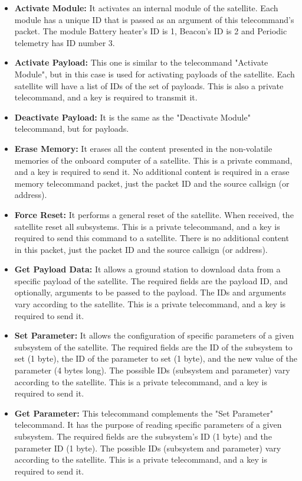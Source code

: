 \begin{itemize}
    \item \textbf{Activate Module: }It activates an internal module of the satellite. Each module has a unique ID that is passed as an argument of this telecommand's packet. The module Battery heater's ID is 1, Beacon's ID is 2 and Periodic telemetry has ID number 3. 
    \item \textbf{Activate Payload:} This one is similar to the telecommand "Activate Module", but in this case is used for activating payloads of the satellite. Each satellite will have a list of IDs of the set of payloads. This is also a private telecommand, and a key is required to transmit it.
    \item \textbf{Deactivate Payload:} It is the same as the "Deactivate Module" telecommand, but for payloads.
    \item \textbf{Erase Memory:} It erases all the content presented in the non-volatile memories of the onboard computer of a satellite. This is a private command, and a key is required to send it. No additional content is required in a erase memory telecommand packet, just the packet ID and the source callsign (or address).
    \item \textbf{Force Reset:} It performs a general reset of the satellite. When received, the satellite reset all subsystems. This is a private telecommand, and a key is required to send this command to a satellite. There is no additional content in this packet, just the packet ID and the source callsign (or address).
    \item \textbf{Get Payload Data:} It allows a ground station to download data from a specific payload of the satellite. The required fields are the payload ID, and optionally, arguments to be passed to the payload. The IDs and arguments vary according to the satellite. This is a private telecommand, and a key is required to send it.
    \item \textbf{Set Parameter:} It allows the configuration of specific parameters of a given subsystem of the satellite. The required fields are the ID of the subsystem to set (1 byte), the ID of the parameter to set (1 byte), and the new value of the parameter (4 bytes long). The possible IDs (subsystem and parameter) vary according to the satellite. This is a private telecommand, and a key is required to send it.
    \item \textbf{Get Parameter:} This telecommand complements the "Set Parameter" telecommand. It has the purpose of reading specific parameters of a given subsystem. The required fields are the subsystem's ID (1 byte) and the parameter ID (1 byte). The possible IDs (subsystem and parameter) vary according to the satellite. This is a private telecommand, and a key is required to send it.
\end{itemize}

